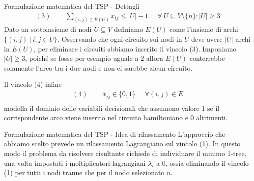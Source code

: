 \documentclass[10pt]{beamer}
\begin{document}
    \begin{frame}{Formulazione matematica del TSP - Dettagli}
        \begin{equation*}
            \begin{split}
            (3)
                \:\:\:\:\:\: & \sum_{(i,j) \in E(U)} x_{ij} \leq |U| - 1 \:\:\:\:\:\: \forall\: U \subseteq V\setminus\{n\} : |U| \geq 3
            \end{split}
        \end{equation*}
        Dato un sottoinsieme di nodi $U \subseteq V$ definiamo $E(U)$ come l'insieme di archi $\{ (i,j) \:|\: i,j \in U \}$.
        Osservando che ogni circuito sui nodi in $U$ deve avere $|U|$ archi in $E(U)$, per eliminare i circuiti abbiamo inserito il vincolo (3).
        Imponiamo $|U| \geq 3$, poiché se fosse per esempio uguale a 2 allora $E(U)$ conterrebbe solamente l'arco tra i due nodi e non ci sarebbe alcun circuito.

        Il vincolo (4) infine
        \begin{equation*}
            \begin{split}
            (4)
                \:\:\:\:\:\: & x_{ij} \in \{0,1\} \:\:\:\:\:\: \forall (i,j) \in E\\
            \end{split}
        \end{equation*}
        modella il dominio delle variabili decisionali che assumono valore 1 se il corrispondente arco viene inserito nel circuito hamiltoniano e 0 altrimenti.
    \end{frame}

    \begin{frame}{Formulazione matematica del TSP - Idea di rilassamento}
        L'approccio che abbiamo scelto prevede un rilassamento Lagrangiano sul vincolo (1).\newline
        In questo modo il problema da risolvere risultante richiede di individuare il minimo 1-tree, una volta impostati i moltiplicatori lagrangiani $\lambda_i$ a 0, ossia eliminando il vincolo (1) per tutti i nodi tranne che per il nodo selezionato $n$.
    \end{frame}
\end{document}
